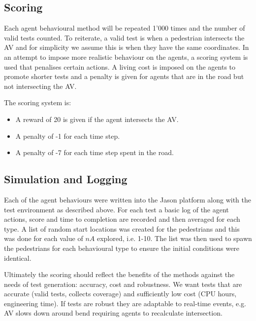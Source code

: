 \documentclass[letterpaper, 10 pt, journal, twoside]{IEEEtran}
\begin{document}

\subsection{Scoring}
Each agent behavioural method will be repeated 1'000 times and the number of valid tests counted. To reiterate, a valid test is when a pedestrian intersects the AV and for simplicity we assume this is when they have the same coordinates. %
In an attempt to impose more realistic behaviour on the agents, a scoring system is used that penalises certain actions. A living cost is imposed on the agents to promote shorter tests and a penalty is given for agents that are in the road but not intersecting the AV.

The scoring system is:
\begin{itemize}
  \item A reward of 20 is given if the agent intersects the AV.
  \item A penalty of -1 for each time step.
  \item A penalty of -7 for each time step spent in the road.
\end{itemize}


\subsection{Simulation and Logging}
Each of the agent behaviours were written into the Jason platform along with the test environment as described above. For each test a basic log of the agent actions, score and time to completion are recorded and then averaged for each type. A list of random start locations was created for the pedestrians and this was done for each value of $nA$ explored, i.e. 1-10. The list was then used to spawn the pedestrians for each behavioural type to ensure the initial conditions were identical.

Ultimately the scoring should reflect the benefits of the methods against the needs of test generation: accuracy, cost and robustness. We want tests that are accurate (valid tests, collects coverage) and sufficiently low cost (CPU hours, engineering time). If tests are robust they are adaptable to real-time events, e.g. AV slows down around bend requiring agents to recalculate intersection.

\end{document}
